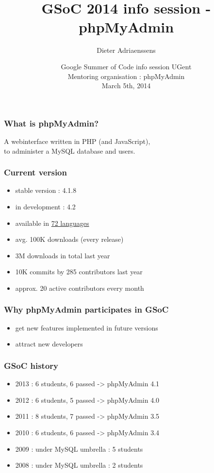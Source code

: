\documentclass[14pt]{beamer}
\title{GSoC 2014 info session - phpMyAdmin}
\author{Dieter Adriaenssens}
\institute[phpMyAdmin]{phpMyAdmin GSoC mentor 2011-2013}
\date[5Mar2014]{Google Summer of Code info session UGent\\
Mentoring organisation : phpMyAdmin\\
March 5th, 2014}
\begin{document}
  \begin{frame}
  \titlepage
  \end{frame}
  \begin{frame}
    \frametitle{What is phpMyAdmin?}
      A webinterface written in PHP (and JavaScript),\\
      to administer a MySQL database and users.
  \end{frame}
  \begin{frame}
    \frametitle{Current version}
    \begin{itemize}
      \item stable version : 4.1.8
      \item in development : 4.2
      \item available in \href{http://www.phpmyadmin.net/home\_page/translations.php}{72 languages}
      \item avg. 100K downloads (every release)
      \item 3M downloads in total last year
      \item 10K commits by 285 contributors last year
      \item approx. 20 active contributors every month
    \end{itemize}
  \end{frame}
  \begin{frame}
    \frametitle{Why phpMyAdmin participates in GSoC}
    \begin{itemize}
      \item get new features implemented in future versions
      \item attract new developers
    \end{itemize}
  \end{frame}
  \begin{frame}
    \frametitle{GSoC history}
    \begin{itemize}
      \item 2013 : 6 students, 6 passed -> phpMyAdmin 4.1
      \item 2012 : 6 students, 5 passed -> phpMyAdmin 4.0
      \item 2011 : 8 students, 7 passed -> phpMyAdmin 3.5
      \item 2010 : 6 students, 6 passed -> phpMyAdmin 3.4
      \item 2009 : under MySQL umbrella : 5 students
      \item 2008 : under MySQL umbrella : 2 students
    \end{itemize}
  \end{frame}
\end{document}
